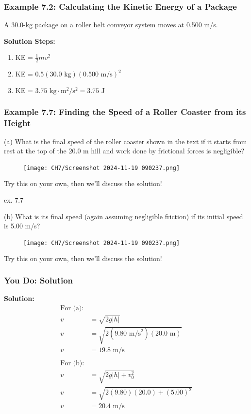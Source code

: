 \documentclass{beamer}
\begin{document}
\begin{frame}
\frametitle{Example 7.2: Calculating the Kinetic Energy of a Package}
A 30.0-kg package on a roller belt conveyor system moves at 0.500 m/s.
\vspace{0.5cm}
\end{frame}

\begin{frame}
\textbf{Solution Steps:}
\begin{enumerate}
    \item KE = $\frac{1}{2}mv^2$ 
    \item KE = $0.5(30.0\text{ kg})(0.500\text{ m/s})^2$
    \item KE = $3.75\text{ kg}\cdot\text{m}^2/\text{s}^2 = 3.75\text{ J}$
\end{enumerate}
\end{frame}

\begin{frame}
\frametitle{Example 7.7: Finding the Speed of a Roller Coaster from its Height}
(a) What is the final speed of the roller coaster shown in the text if it starts from rest at the top of the 20.0 m hill and work done by frictional forces is negligible?

\begin{figure}[H]
    \centering
    \texttt{[image: CH7/Screenshot 2024-11-19 090237.png]}
\end{figure}
Try this on your own, then we'll discuss the solution!
\end{frame}

\begin{frame}{ex. 7.7}
    

(b) What is its final speed (again assuming negligible friction) if its initial speed is 5.00 m/s?

\begin{figure}[H]
    \centering
    \texttt{[image: CH7/Screenshot 2024-11-19 090237.png]}
\end{figure}
Try this on your own, then we'll discuss the solution!
\end{frame}

\begin{frame}
\frametitle{You Do: Solution}
\textbf{Solution:}
\begin{align*}
\text{For (a):} \\
v &= \sqrt{2g|h|} \\
v &= \sqrt{2(9.80\text{ m/s}^2)(20.0\text{ m})} \\
v &= 19.8\text{ m/s} \\
\\
\text{For (b):} \\
v &= \sqrt{2g|h| + v_0^2} \\
v &= \sqrt{2(9.80)(20.0) + (5.00)^2} \\
v &= 20.4\text{ m/s}
\end{align*}
\end{frame}
\end{document}
